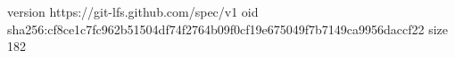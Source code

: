 version https://git-lfs.github.com/spec/v1
oid sha256:cf8ce1c7fc962b51504df74f2764b09f0cf19e675049f7b7149ca9956daccf22
size 182
